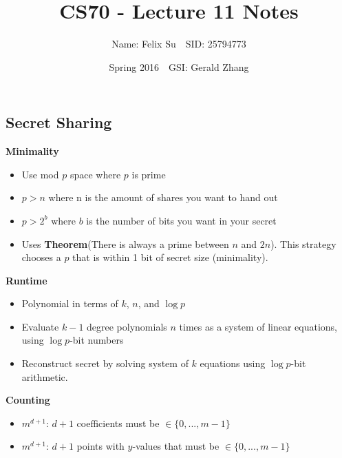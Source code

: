 \documentclass{article}\usepackage{amsmath,amssymb,amsthm,tikz,tkz-graph,color,chngpage,soul,hyperref,csquotes,graphicx,floatrow,polynom}\newcommand*{\QEDB}{\hfill\ensuremath{\square}}\newtheorem*{prop}{Proposition}\renewcommand{\theenumi}{\alph{enumi}}\usepackage[shortlabels]{enumitem}\usepackage[nobreak=true]{mdframed}\usetikzlibrary{matrix,calc}\MakeOuterQuote{"}\usepackage[margin=0.75in]{geometry} \newtheorem{theorem}{Theorem}
\title{CS70 - Lecture 11 Notes}
\author{Name: Felix Su$\quad$SID: 25794773}
\date{Spring 2016$\quad$GSI: Gerald Zhang}
\begin{document}
\maketitle

\subsection*{Secret Sharing}
\textbf{Minimality}
\begin{itemize}
\item Use mod $p$ space where $p$ is prime
\item $p > n$ where n is the amount of shares you want to hand out
\item $p > 2^b$ where $b$ is the number of bits you want in your secret
\item Uses \textbf{Theorem}(There is always a prime between $n$ and $2n$). This strategy chooses a $p$ that is within 1 bit of secret size (minimality).
\end{itemize}
\textbf{Runtime}
\begin{itemize}
\item Polynomial in terms of $k$, $n$, and $\log{p}$
\item Evaluate $k-1$ degree polynomials $n$ times as a system of linear equations, using $\log{p}$-bit numbers
\item Reconstruct secret by solving system of $k$ equations using $\log{p}$-bit arithmetic.
\end{itemize}
\textbf{Counting}
\begin{itemize}
\item $m^{d+1}$: $d+1$ coefficients must be $\in \{0, ..., m-1\}$
\item $m^{d+1}$: $d+1$ points with $y$-values that must be $\in \{0, ..., m-1\}$
\end{itemize}

\end{document}
